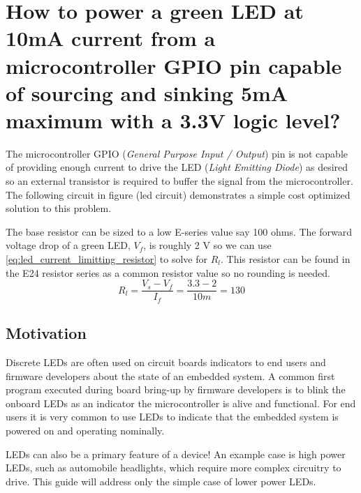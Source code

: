 \documentclass[main.tex]{subfiles}
\begin{document}
\section{How to power a green LED at 10mA current from a microcontroller GPIO pin capable of sourcing and sinking 5mA maximum with a 3.3V logic level?}

\spoilerline

\noindent The microcontroller GPIO (\textit{General Purpose Input / Output}) pin is not capable of providing enough current to drive the LED (\textit{Light Emitting Diode}) as desired so an external transistor is required to buffer the signal from the microcontroller. The following circuit in figure (led circuit) demonstrates a simple cost optimized solution to this problem. 


The base resistor can be sized to a low E-series value say 100 ohms. The forward voltage drop of a green LED, $V_f$, is roughly 2 V so we can use \eqref{eq:led_current_limitting_resistor} to solve for $R_l$. This resistor can be found in the E24 resistor series as a common resistor value so no rounding is needed. 
\begin{equation}
    R_l = \frac{V_s - V_f}{I_f} = \frac{3.3-2}{10m} =  130 
    \label{eq:led_current_limitting_resistor}
\end{equation}

\subsection{Motivation}
Discrete LEDs are often used on circuit boards indicators to end users and firmware developers about the state of an embedded system. A common first program executed during board bring-up by firmware developers is to blink the onboard LEDs as an indicator the microcontroller is alive and functional. For end users it is very common to use LEDs to indicate that the embedded system is powered on and operating nominally. 

LEDs can also be a primary feature of a device! An example case is high power LEDs, such as automobile headlights, which require more complex circuitry to drive. This guide will address only the simple case of lower power LEDs. 
\end{document}
